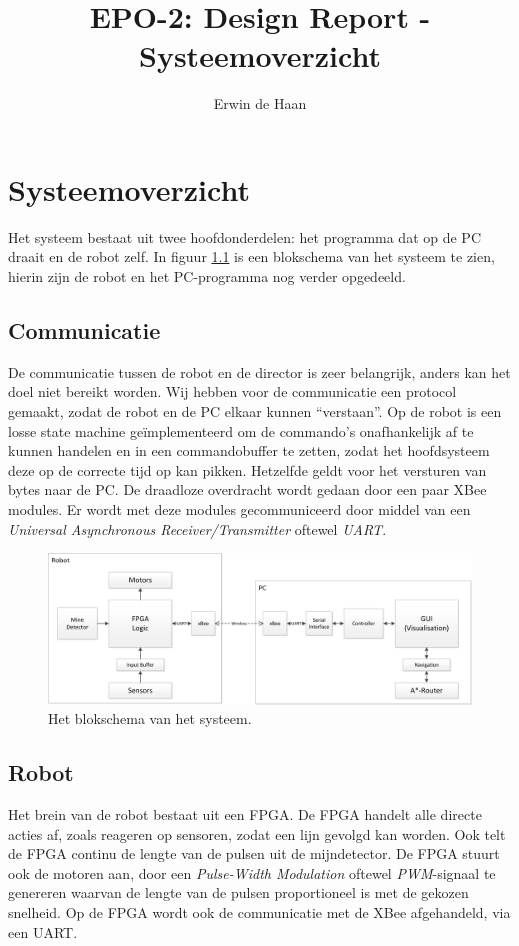 \documentclass{report}
\title{EPO-2: Design Report - Systeemoverzicht}
\author{Erwin de Haan}
\begin{document}
\chapter{Systeemoverzicht}
\label{ch:systeem}
Het systeem bestaat uit twee hoofdonderdelen: het programma dat op de PC draait en de robot zelf.
In figuur \ref{fig:topLevelSystem} is een blokschema van het systeem te zien, hierin zijn de robot en het PC-programma nog verder opgedeeld. 
\section{Communicatie}
De communicatie tussen de robot en de director is zeer belangrijk, anders kan het doel niet bereikt worden.
Wij hebben voor de communicatie een protocol gemaakt, zodat de robot en de PC elkaar kunnen ``verstaan''.
Op de robot is een losse state machine geïmplementeerd om de commando's onafhankelijk af te kunnen handelen en in een commandobuffer te zetten, zodat het hoofdsysteem deze op de correcte tijd op kan pikken.
Hetzelfde geldt voor het versturen van bytes naar de PC.
De draadloze overdracht wordt gedaan door een paar XBee modules.
Er wordt met deze modules gecommuniceerd door middel van een \textit{Universal Asynchronous Receiver/Transmitter} oftewel \textit{UART}.

\begin{figure}

\centering
\caption{Het blokschema van het systeem.}
\label{fig:topLevelSystem}
\includegraphics[width=\textwidth,angle=90]{top-level-system}

\end{figure}

\section{Robot}
Het brein van de robot bestaat uit een FPGA.
De FPGA handelt alle directe acties af, zoals reageren op sensoren, zodat een lijn gevolgd kan worden.
Ook telt de FPGA continu de lengte van de pulsen uit de mijndetector.
De FPGA stuurt ook de motoren aan, door een \textit{Pulse-Width Modulation} oftewel \textit{PWM}-signaal te genereren waarvan de lengte van de pulsen proportioneel is met de gekozen snelheid.
Op de FPGA wordt ook de communicatie met de XBee afgehandeld, via een UART.
\end{document}
